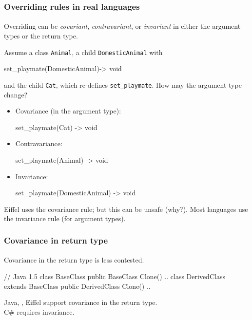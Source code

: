 \documentclass{beamer}
\begin{document}
\begin{frame}[fragile]
\frametitle{Overriding rules in real languages}
\framesubtitle{}
Overriding can be \textit{covariant}, 
\textit{contravariant}, or \textit{invariant} in either
the argument types or the return type.
\bigskip


Assume a class \texttt{Animal}, a child \texttt{DomesticAnimal} with 
\begin{cplus3}
       set_playmate(DomesticAnimal)->  void 
\end{cplus3}

and the child \texttt{Cat},
which re-defines \texttt{set_playmate}. 
How may the argument type change?%
\begin{itemize}
\item Covariance (in the argument type):
\begin{cplus3}
 set_playmate(Cat) -> void
\end{cplus3}
 \item Contravariance:
\begin{cplus3}
 set_playmate(Animal) -> void
\end{cplus3}
  \item Invariance: 
\begin{cplus3}
 set_playmate(DomesticAnimal) -> void
\end{cplus3}


\end{itemize}
Eiffel uses the covariance rule; but this can be unsafe (why?).
Most languages use the invariance rule (for argument types). 
\end{frame}

\begin{frame}[fragile]
\frametitle{Covariance in return type}
\framesubtitle{}
Covariance in the return type is less contested.
\bigskip

\begin{cplus3}
// Java 1.5
class BaseClass {
    public BaseClass Clone() {..}
}
class DerivedClass extends BaseClass {
    public DerivedClass Clone() {..}
}
\end{cplus3}
Java, \Cpp, Eiffel support covariance in the return type.\\
C\# requires invariance. 
\end{frame}
\end{document}
